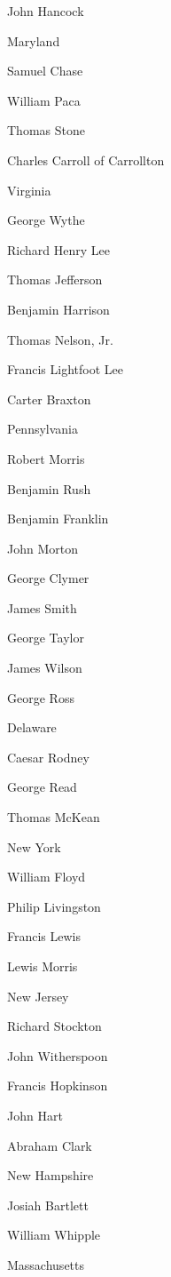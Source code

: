\documentclass[a4paper,landscape,10pt]{article}
\begin{document}
John Hancock

Maryland

Samuel Chase

William Paca

Thomas Stone

Charles Carroll of Carrollton



Virginia

George Wythe

Richard Henry Lee

Thomas Jefferson

Benjamin Harrison

Thomas Nelson, Jr.

Francis Lightfoot Lee

Carter Braxton



Pennsylvania

Robert Morris

Benjamin Rush

Benjamin Franklin

John Morton

George Clymer

James Smith

George Taylor

James Wilson

George Ross

Delaware

Caesar Rodney

George Read

Thomas McKean



New York

William Floyd

Philip Livingston

Francis Lewis

Lewis Morris



New Jersey

Richard Stockton

John Witherspoon

Francis Hopkinson

John Hart

Abraham Clark



New Hampshire

Josiah Bartlett

William Whipple



Massachusetts
\end{document}
